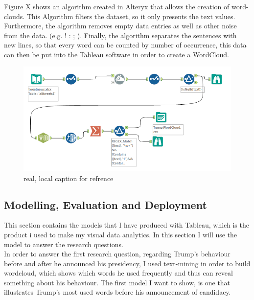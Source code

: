 \documentclass[11pt]{article}
\begin{document}
Figure X shows an algorithm created in Alteryx that allows the creation of word-clouds. This Algorithm filters the dataset, so it only presents the text values. Furthermore, the algorithm removes empty data entries as well as other noise from the data. (e.g. ! : ; ). Finally, the algorithm separates the sentences with new lines, so that every word can be counted by number of occurrence, this data can then be put into the Tableau software in order to create a WordCloud.



\begin{figure}[H] %
	\centering %
\includegraphics [scale= .65]  {TrumpWordCloudAlteryxFinal.PNG}    %
	\caption[Optional caption] {real, local caption for refrence}
	\label{fig:wordcloudBliz}

\end{figure}

\subsection{Modelling, Evaluation and Deployment}
This section contains the models that I have produced with Tableau, which is the product i used to make my visual data analytics. In this section I will use the model to answer the research questions. \\

In order to answer the first research question, regarding Trump's behaviour before and after he announced his presidency, I used text-mining in order to build wordcloud, which shows which words he used frequently and thus can reveal something about his behaviour. The first model I want to show, is one that illustrates Trump's most used words before his announcement of candidacy.
\end{document}
